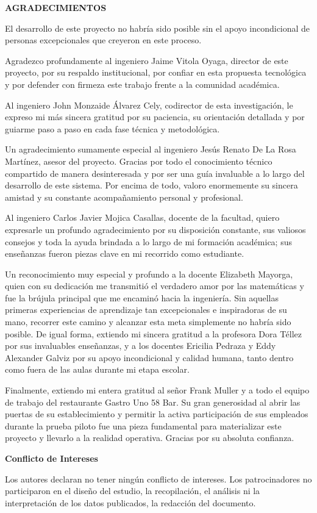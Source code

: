 \newpage
\thispagestyle{empty}

\begin{center}
	{\large\bfseries AGRADECIMIENTOS}
\end{center}

\vspace{1cm}

\noindent
El desarrollo de este proyecto no habría sido posible sin el apoyo incondicional de personas excepcionales que creyeron en este proceso.

Agradezco profundamente al ingeniero Jaime Vitola Oyaga, director de este proyecto, por su respaldo institucional, por confiar en esta propuesta tecnológica y por defender con firmeza este trabajo frente a la comunidad académica.

Al ingeniero John Monzaide Álvarez Cely, codirector de esta investigación, le expreso mi más sincera gratitud por su paciencia, su orientación detallada y por guiarme paso a paso en cada fase técnica y metodológica.

Un agradecimiento sumamente especial al ingeniero Jesús Renato De La Rosa Martínez, asesor del proyecto. Gracias por todo el conocimiento técnico compartido de manera desinteresada y por ser una guía invaluable a lo largo del desarrollo de este sistema. Por encima de todo, valoro enormemente su sincera amistad y su constante acompañamiento personal y profesional.

Al ingeniero Carlos Javier Mojica Casallas, docente de la facultad, quiero expresarle un profundo agradecimiento por su disposición constante, sus valiosos consejos y toda la ayuda brindada a lo largo de mi formación académica; sus enseñanzas fueron piezas clave en mi recorrido como estudiante.

Un reconocimiento muy especial y profundo a la docente Elizabeth Mayorga, quien con su dedicación me transmitió el verdadero amor por las matemáticas y fue la brújula principal que me encaminó hacia la ingeniería. Sin aquellas primeras experiencias de aprendizaje tan excepcionales e inspiradoras de su mano, recorrer este camino y alcanzar esta meta simplemente no habría sido posible. De igual forma, extiendo mi sincera gratitud a la profesora Dora Téllez por sus invaluables enseñanzas, y a los docentes Ericilia Pedraza y Eddy Alexander Galviz por su apoyo incondicional y calidad humana, tanto dentro como fuera de las aulas durante mi etapa escolar.


Finalmente, extiendo mi entera gratitud al señor Frank Muller y a todo el equipo de trabajo del restaurante Gastro Uno 58 Bar. Su gran generosidad al abrir las puertas de su establecimiento y permitir la activa participación de sus empleados durante la prueba piloto fue una pieza fundamental para materializar este proyecto y llevarlo a la realidad operativa. Gracias por su absoluta confianza.
\vspace{1cm}


\newpage
{\bfseries Conflicto de Intereses}


\vspace{1cm}

\noindent
Los autores declaran no tener ningún conflicto de intereses. Los patrocinadores no participaron en el diseño del estudio, la recopilación, el análisis ni la interpretación de los datos publicados, la redacción del documento.
